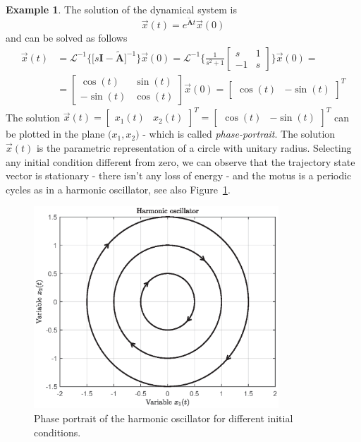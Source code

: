 \documentclass[11pt,a4paper,oneside]{book}
\numberwithin{equation}{section}
\theoremstyle{it}
\theoremstyle{definition}
\newtheorem{example}{Example}[chapter]
\begin{document}
\begin{example}
The solution of the dynamical system is 
\begin{equation}
	\vec{x}(t) = e^{\tilde{\mathbf{A}}t}\vec{x}(0)
\end{equation}
and can be solved as follows
\begin{equation}
	\begin{aligned}
		\vec{x}(t) &= 
		\mathcal{L}^{-1}\Big\{\Big[s\mathbf{I}-\tilde{\mathbf{A}}\Big]^{-1}\Big\}\vec{x}(0)
		 = \mathcal{L}^{-1}\Big\{\frac{1}{s^2+1}\begin{bmatrix} s & 1 \\ -1 & s 
		\end{bmatrix}\Big\}\vec{x}(0) = \\[6pt]
		&= \begin{bmatrix} \cos(t) & \sin(t) \\ -\sin(t) & \cos(t) \end{bmatrix}\vec{x}(0) = \begin{bmatrix} \cos(t) & -\sin(t) \end{bmatrix}^T
	\end{aligned}
\end{equation}
The solution $\vec{x}(t) = \begin{bmatrix} x_1(t) & x_2(t) \end{bmatrix}^T = 
\begin{bmatrix} \cos(t) & -\sin(t) \end{bmatrix}^T$ can be plotted in the plane 
$\big(x_1 , x_2\big)$ - which is called \textit{phase-portrait}. The solution 
$\vec{x}(t)$ is the parametric representation of a circle with unitary radius. 
Selecting any initial condition different from zero, we can observe that the 
trajectory state vector is stationary - there isn't any loss of energy - and 
the motus is a periodic cycles as in a harmonic oscillator, see also 
Figure~\ref{figure_armonic_oscillator}.
\begin{figure}[H]
	\centering
	\includegraphics[width = 260pt, keepaspectratio]{figures/harmonic_oscillator.eps}
	\captionsetup{width=0.75\textwidth}		
	\caption{Phase portrait of the harmonic oscillator for different initial conditions.}
	\label{figure_armonic_oscillator}
\end{figure}


\end{example}
\end{document}
